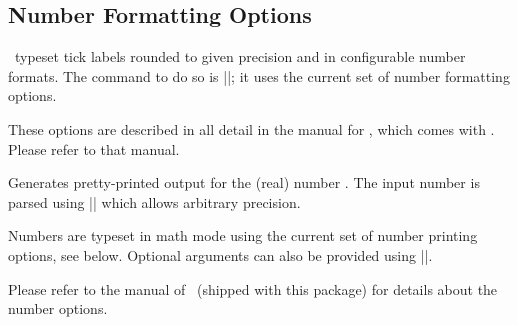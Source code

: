\subsection{Number Formatting Options}
\label{sec:number:printing}%
\PGFPlots\ typeset tick labels rounded to given precision and in configurable number formats. The command to do so is |\pgfmathprintnumber|; it uses the current set of number formatting options.

These options are described in all detail in the manual for \PGFPlotstable, which comes with \PGFPlots. Please refer to that manual.

\begin{command}{\pgfmathprintnumber{}}
Generates pretty-printed output for the (real) number . The input number  is parsed using |\pgfmathfloatparsenumber| which allows arbitrary precision.

Numbers are typeset in math mode using the current set of number printing options, see below. Optional arguments can also be provided using ||.

Please refer to the manual of \PGFPlotstable\ (shipped with this package) for details about the number options.
\end{command}

